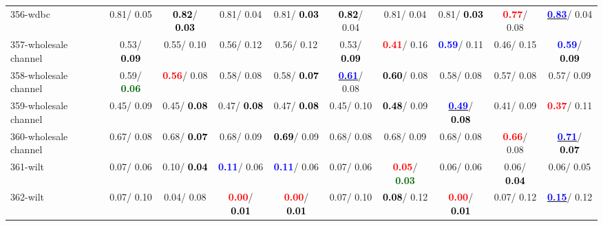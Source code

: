 \begin{table}[h]
\begin{center}
{\begin{tabular}{lc|c|c|c|c|c|c|c|c}
356-wdbc &   0.81/  0.05 & \textcolor{black}{\textbf{  0.82}}/\textcolor{black}{\textbf{  0.03}} &   0.81/  0.04 &   0.81/\textcolor{black}{\textbf{  0.03}} & \textcolor{black}{\textbf{  0.82}}/  0.04 &   0.81/  0.04 &   0.81/\textcolor{black}{\textbf{  0.03}} & \textcolor{red}{\textbf{  0.77}}/  0.08 & \underline{\textcolor{blue}{\textbf{  0.83}}}/  0.04 \\
357-wholesale channel &   0.53/\textcolor{black}{\textbf{  0.09}} &   0.55/  0.10 &   0.56/  0.12 &   0.56/  0.12 &   0.53/\textcolor{black}{\textbf{  0.09}} & \textcolor{red}{\textbf{  0.41}}/  0.16 & \textcolor{blue}{\textbf{  0.59}}/  0.11 &   0.46/  0.15 & \textcolor{blue}{\textbf{  0.59}}/\textcolor{black}{\textbf{  0.09}} \\
358-wholesale channel &   0.59/\textcolor{darkgreen}{\textbf{  0.06}} & \textcolor{red}{\textbf{  0.56}}/  0.08 &   0.58/  0.08 &   0.58/\textcolor{black}{\textbf{  0.07}} & \underline{\textcolor{blue}{\textbf{  0.61}}}/  0.08 & \textcolor{black}{\textbf{  0.60}}/  0.08 &   0.58/  0.08 &   0.57/  0.08 &   0.57/  0.09 \\
359-wholesale channel &   0.45/  0.09 &   0.45/\textcolor{black}{\textbf{  0.08}} &   0.47/\textcolor{black}{\textbf{  0.08}} &   0.47/\textcolor{black}{\textbf{  0.08}} &   0.45/  0.10 & \textcolor{black}{\textbf{  0.48}}/  0.09 & \underline{\textcolor{blue}{\textbf{  0.49}}}/\textcolor{black}{\textbf{  0.08}} &   0.41/  0.09 & \textcolor{red}{\textbf{  0.37}}/  0.11 \\ \hline
360-wholesale channel &   0.67/  0.08 &   0.68/\textcolor{black}{\textbf{  0.07}} &   0.68/  0.09 & \textcolor{black}{\textbf{  0.69}}/  0.09 &   0.68/  0.08 &   0.68/  0.09 &   0.68/  0.08 & \textcolor{red}{\textbf{  0.66}}/  0.08 & \underline{\textcolor{blue}{\textbf{  0.71}}}/\textcolor{black}{\textbf{  0.07}} \\
361-wilt &   0.07/  0.06 &   0.10/\textcolor{black}{\textbf{  0.04}} & \textcolor{blue}{\textbf{  0.11}}/  0.06 & \textcolor{blue}{\textbf{  0.11}}/  0.06 &   0.07/  0.06 & \textcolor{red}{\textbf{  0.05}}/\textcolor{darkgreen}{\textbf{  0.03}} &   0.06/  0.06 &   0.06/\textcolor{black}{\textbf{  0.04}} &   0.06/  0.05 \\
362-wilt &   0.07/  0.10 &   0.04/  0.08 & \textcolor{red}{\textbf{  0.00}}/\textcolor{black}{\textbf{  0.01}} & \textcolor{red}{\textbf{  0.00}}/\textcolor{black}{\textbf{  0.01}} &   0.07/  0.10 & \textcolor{black}{\textbf{  0.08}}/  0.12 & \textcolor{red}{\textbf{  0.00}}/\textcolor{black}{\textbf{  0.01}} &   0.07/  0.12 & \underline{\textcolor{blue}{\textbf{  0.15}}}/  0.12 \\

\end{tabular}}
\end{center}
\end{table}
